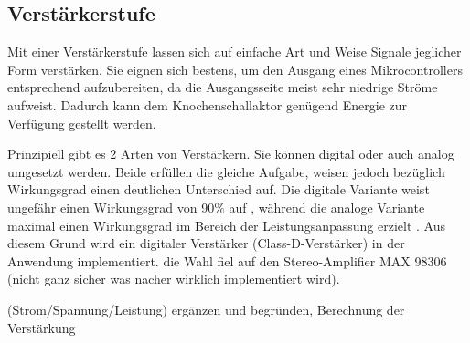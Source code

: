 \subsection{Verstärkerstufe} \label{sec:verstaerkerstufe}

Mit einer Verstärkerstufe lassen sich auf einfache Art und Weise Signale jeglicher Form verstärken. Sie eignen sich bestens, um den Ausgang eines Mikrocontrollers entsprechend aufzubereiten, da die Ausgangsseite meist sehr niedrige Ströme aufweist. Dadurch kann dem Knochenschallaktor genügend Energie zur Verfügung gestellt werden.

Prinzipiell gibt es 2 Arten von Verstärkern. Sie können digital oder auch analog umgesetzt werden. Beide erfüllen die gleiche Aufgabe, weisen jedoch bezüglich Wirkungsgrad einen deutlichen Unterschied auf. Die digitale Variante weist ungefähr einen Wirkungsgrad von 90$\%$ auf \cite{BoneConductorAdafruit}, während die analoge Variante maximal einen Wirkungsgrad im Bereich der Leistungsanpassung erzielt \cite{Niklaus_Skript}. Aus diesem Grund wird ein digitaler Verstärker (Class-D-Verstärker) in der Anwendung implementiert. die Wahl fiel auf den Stereo-Amplifier MAX 98306 (nicht ganz sicher was nacher wirklich implementiert wird).

(Strom/Spannung/Leistung) ergänzen und begründen, Berechnung der Verstärkung